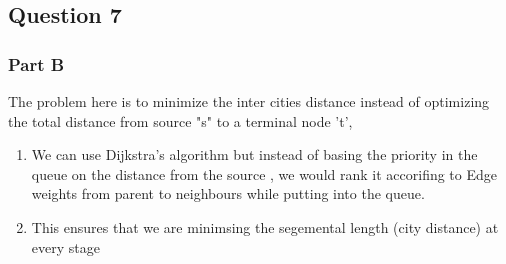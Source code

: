 \documentclass[11pt]{article}
\providecommand{\tightlist}{%
      \setlength{\itemsep}{0pt}\setlength{\parskip}{0pt}}
\begin{document}
    \subsection{Question 7}\label{question-7}

\subsubsection{Part B}\label{part-b}

    The problem here is to minimize the inter cities distance instead of
optimizing the total distance from source "s" to a terminal node 't',

\begin{enumerate}
\def\labelenumi{\arabic{enumi}.}
\tightlist
\item
  We can use Dijkstra's algorithm but instead of basing the priority in
  the queue on the distance from the source , we would rank it
  accorifing to Edge weights from parent to neighbours while putting
  into the queue.
\item
  This ensures that we are minimsing the segemental length (city
  distance) at every stage
\end{enumerate}
\end{document}
